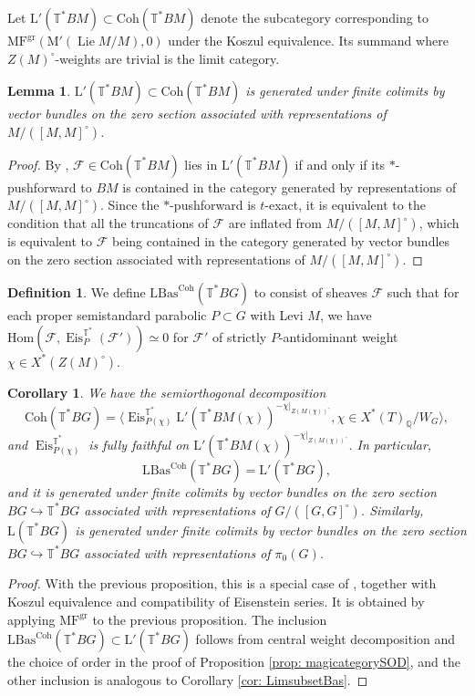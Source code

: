 \documentclass{amsart}
\newtheorem{lemma}[theorem]{Lemma}
\newtheorem{corollary}[theorem]{Corollary}
\theoremstyle{definition}
\newtheorem{definition}[theorem]{Definition}
\theoremstyle{remark}
\numberwithin{equation}{section}
\DeclareMathOperator{\Lie}{Lie}
\newcommand{\mc}{\mathcal}
\newcommand{\Q}{\mathbb{Q}}
\newcommand{\Hom}{\mathrm{Hom}}
\DeclareMathOperator{\Eis}{\mathrm{Eis}}
\newcommand{\Coh}{\mathrm{Coh}}
\newcommand{\T}{\mathbb{T}}
\newcommand{\LBas}{\mathrm{LBas}}
\DeclareMathOperator{\gr}{gr}
\newcommand{\MF}{\mathrm{MF}}
\newcommand{\mrL}{\mathrm{L}}
\newcommand{\M}{\mathrm{M}}
\begin{document}
Let $\mrL'(\T^* BM)\subset \Coh(\T^* BM)$ denote the subcategory corresponding to $\MF^{\gr}(\M'(\Lie M/M), 0)$ under the Koszul equivalence. Its summand where $Z(M)^\circ$-weights are trivial is the limit category. 

\begin{lemma}
$\mrL'(\T^* BM)\subset \Coh(\T^* BM)$ is generated under finite colimits by vector bundles on the zero section associated with representations of $M/([M, M]^\circ)$. 
\end{lemma}

\begin{proof}
By \cite[Lemma 2.23]{PTqBPSsymquiverswithpotential}, $\mc F\in \Coh(\T^*BM)$ lies in $\mrL' (\T^* BM)$ if and only if its $*$-pushforward to $BM$ is contained in the category generated by representations of $M/([M,M]^\circ)$. Since the $*$-pushforward is $t$-exact, it is equivalent to the condition that all the truncations of $\mc F$ are inflated from $M/([M,M]^\circ)$, which is equivalent to $\mc F$ being contained in the category generated by vector bundles on the zero section associated with representations of $M/([M,M]^\circ)$. 
\end{proof}

\begin{definition}
We define $\LBas^{\Coh}(\T^{\ast}BG)$ to consist of sheaves $\mc{F}$ such that for each proper semistandard parabolic $P \subset G$ with Levi $M$, we have $\Hom(\mc F, \Eis^{\T^*}_{P}(\mc{F}') ) \simeq 0$ for $\mc{F}'$ of strictly $P$-antidominant weight $\chi \in X^{\ast}(Z(M)^\circ)$. 
\end{definition}

\begin{corollary}{\label{cor: limcatclassifyingstack}}
We have the semiorthogonal decomposition
\[
\Coh(\T^* BG)=\langle \Eis_{P(\chi)}^{\T^*}\mrL' (\T^* BM(\chi))^{-\chi|_{Z(M(\chi))^\circ}} , \chi\in X^*(T)_\Q /W_G\rangle,
\]
and $\Eis_{P(\chi)}^{\T^*}$ is fully faithful on $\mrL' (\T^* BM(\chi))^{-\chi|_{Z(M(\chi))^\circ}}$. In particular, 
\[
\LBas^\Coh(\T^* BG)=\mrL' (\T^* BG), 
\]
and it is generated under finite colimits by vector bundles on the zero section $BG\hookrightarrow \T^* BG$ associated with representations of $G/([G,G]^\circ)$. Similarly, $\mrL (\T^* BG)$ is generated under finite colimits by vector bundles on the zero section $BG\hookrightarrow \T^* BG$ associated with representations of $\pi_0(G)$. 
\end{corollary}

\begin{proof}
With the previous proposition, this is a special case of \cite[Theorem 3.5.6]{BuPadurariuToda}, together with Koszul equivalence and compatibility of Eisenstein series. It is obtained by applying $\MF^{\gr}$ to the previous proposition. The inclusion $\LBas^\Coh(\T^* BG)\subset \mrL' (\T^* BG)$ follows from central weight decomposition and the choice of order in the proof of Proposition \ref{prop: magicategorySOD}, and the other inclusion is analogous to Corollary \ref{cor: LimsubsetBas}.    
\end{proof}
\end{document}
